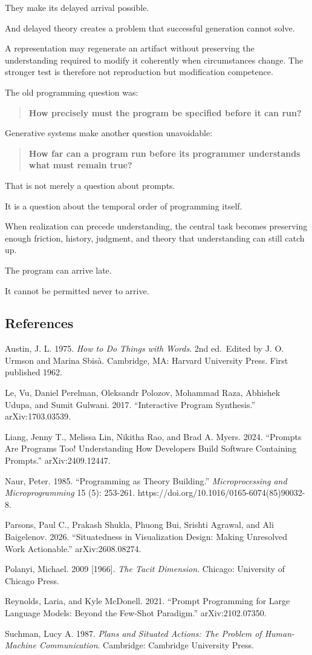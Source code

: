 \documentclass[
]{article}
\begin{document}
They make its delayed arrival possible.

And delayed theory creates a problem that successful generation cannot
solve.

A representation may regenerate an artifact without preserving the
understanding required to modify it coherently when circumstances
change. The stronger test is therefore not reproduction but modification
competence.

The old programming question was:

\begin{quote}
\textbf{How precisely must the program be specified before it can run?}
\end{quote}

Generative systems make another question unavoidable:

\begin{quote}
\textbf{How far can a program run before its programmer understands what
must remain true?}
\end{quote}

That is not merely a question about prompts.

It is a question about the temporal order of programming itself.

When realization can precede understanding, the central task becomes
preserving enough friction, history, judgment, and theory that
understanding can still catch up.

The program can arrive late.

It cannot be permitted never to arrive.

\subsection{References}\label{references}

Austin, J. L. 1975. \emph{How to Do Things with Words}. 2nd ed.~Edited
by J. O. Urmson and Marina Sbisà. Cambridge, MA: Harvard University
Press. First published 1962.

Le, Vu, Daniel Perelman, Oleksandr Polozov, Mohammad Raza, Abhishek
Udupa, and Sumit Gulwani. 2017. ``Interactive Program Synthesis.''
arXiv:1703.03539.

Liang, Jenny T., Melissa Lin, Nikitha Rao, and Brad A. Myers. 2024.
``Prompts Are Programs Too! Understanding How Developers Build Software
Containing Prompts.'' arXiv:2409.12447.

Naur, Peter. 1985. ``Programming as Theory Building.''
\emph{Microprocessing and Microprogramming} 15 (5): 253-261.
https://doi.org/10.1016/0165-6074(85)90032-8.

Parsons, Paul C., Prakash Shukla, Phuong Bui, Srishti Agrawal, and Ali
Baigelenov. 2026. ``Situatedness in Visualization Design: Making
Unresolved Work Actionable.'' arXiv:2608.08274.

Polanyi, Michael. 2009 {[}1966{]}. \emph{The Tacit Dimension}. Chicago:
University of Chicago Press.

Reynolds, Laria, and Kyle McDonell. 2021. ``Prompt Programming for Large
Language Models: Beyond the Few-Shot Paradigm.'' arXiv:2102.07350.

Suchman, Lucy A. 1987. \emph{Plans and Situated Actions: The Problem of
Human-Machine Communication}. Cambridge: Cambridge University Press.
\end{document}
